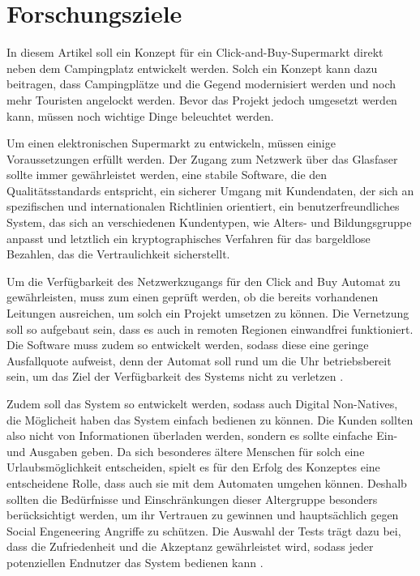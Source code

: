 \section{Forschungsziele}


In diesem Artikel soll ein Konzept für ein Click-and-Buy-Supermarkt direkt neben dem Campingplatz 
entwickelt werden. Solch ein Konzept kann dazu beitragen, dass Campingplätze und die Gegend
modernisiert werden und noch mehr Touristen angelockt werden. Bevor das Projekt jedoch umgesetzt 
werden kann, müssen noch wichtige Dinge beleuchtet werden. 


Um einen elektronischen Supermarkt zu entwickeln, müssen einige Voraussetzungen erfüllt werden.
Der Zugang zum Netzwerk über das Glasfaser sollte immer gewährleistet werden, eine stabile 
Software, die den Qualitätsstandards entspricht, ein sicherer Umgang mit Kundendaten, der sich an 
spezifischen und internationalen Richtlinien orientiert, ein benutzerfreundliches System, das sich an 
verschiedenen Kundentypen, wie Alters- und Bildungsgruppe anpasst und letztlich ein kryptographisches
Verfahren für das bargeldlose Bezahlen, das die Vertraulichkeit sicherstellt.


Um die Verfügbarkeit des Netzwerkzugangs für den Click and Buy Automat zu gewährleisten, muss zum einen 
geprüft werden, ob die bereits vorhandenen Leitungen ausreichen, um solch ein Projekt umsetzen zu können.
Die Vernetzung soll so aufgebaut sein, dass es auch in remoten Regionen einwandfrei funktioniert. 
Die Software muss zudem so entwickelt werden, sodass diese eine geringe Ausfallquote aufweist, 
denn der Automat soll rund um die Uhr betriebsbereit sein, um das Ziel der Verfügbarkeit des
 Systems nicht zu verletzen \cite{refbook:SWIS}.


Zudem soll das System so entwickelt werden, sodass auch Digital Non-Natives, die Möglicheit
\cite{refart:QWDN} haben das System einfach bedienen zu können. Die Kunden sollten also nicht von 
Informationen überladen werden, sondern es sollte einfache Ein- und Ausgaben geben. Da sich besonderes
ältere Menschen für solch eine Urlaubsmöglichkeit entscheiden, spielt es für den Erfolg des Konzeptes 
eine entscheidene Rolle, dass auch sie mit dem Automaten umgehen können. Deshalb sollten die Bedürfnisse
und Einschränkungen dieser Altergruppe besonders berücksichtigt werden, um ihr Vertrauen zu gewinnen
\cite{refart:HLAU} und hauptsächlich gegen Social Engeneering Angriffe zu schützen. Die Auswahl der
Tests trägt dazu bei, dass die Zufriedenheit und die Akzeptanz gewährleistet wird, sodass jeder 
potenziellen Endnutzer das System bedienen kann \cite{refbook:IASE}.

